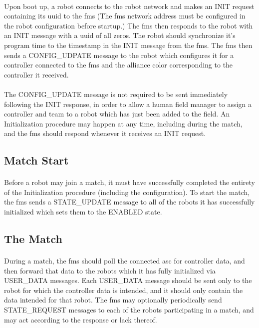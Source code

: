 \documentclass[11pt]{article}
\begin{document}
\paragraph{}
Upon boot up, a robot connects to the robot network and makes an INIT request containing its \acrfull{uuid} to the \acrfull{fms} 
(The \acrshort{fms} network address must be configured in the robot configuration before startup.) 
The \acrshort{fms} then responds to the robot with an INIT message with a \acrshort{uuid} of all zeros. 
The robot should synchronize it's program time to the timestamp in the INIT message from the \acrshort{fms}.
The \acrshort{fms} then sends a CONFIG\_UDPATE message to the robot which configures it for a controller connected 
to the \acrshort{fms} and the alliance color corresponding to the controller it received. 
\paragraph{}
The CONFIG\_UPDATE message is not required to be sent immediately following the INIT response, 
in order to allow a human field manager to assign a controller and team to a robot which has just been added to the field.
An Initialization procedure may happen at any time, including during the match,
and the \acrshort{fms} should respond whenever it receives an INIT request.

\subsection{Match Start}
\paragraph{}
Before a robot may join a match, it must have successfully completed the entirety of the Initialization procedure 
(including the configuration).  
To start the match, the \acrshort{fms} sends a STATE\_UPDATE message to all of the robots it has successfully initialized 
which sets them to the ENABLED state.

\subsection {The Match}
\paragraph{}
During a match, the \acrshort{fms} should poll the connected \acrfull{asc} for controller data, 
and then forward that data to the robots which it has fully initialized via USER\_DATA messages.
Each USER\_DATA message should be sent only to the robot for which the controller data is intended,
and it should only contain the data intended for that robot.
The \acrshort{fms} may optionally periodically send STATE\_REQUEST messages to each of the robots participating in a match,
and may act according to the response or lack thereof.
\end{document}
